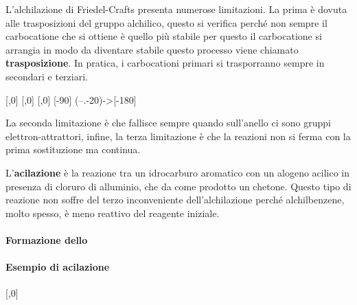 L'alchilazione di Friedel-Crafts presenta numerose limitazioni. La prima è dovuta alle trasposizioni del gruppo alchilico, questo si verifica perché non sempre il carbocatione che si ottiene è quello più stabile per questo il carbocatione si arrangia in modo da diventare stabile questo processo viene chiamato \textbf{trasposizione}. In pratica, i carbocationi primari si trasporranno sempre in secondari e terziari.
\chemnameinit{}
\begin{reaction}
	[,0]
	 [,0]\+ 
	 [,0]\+ 
	\arrow{->[*{0}trasposizione]}[-90]
	\arrow(--.-20){->}[-180]
\end{reaction}
\chemnameinit{}
La seconda limitazione è che fallisce sempre quando sull'anello ci sono gruppi elettron-attrattori, infine, la terza limitazione è che la reazioni non si ferma con la prima sostituzione ma continua.


L'\textbf{acilazione} è la reazione tra un idrocarburo aromatico con un alogeno acilico in presenza di cloruro di alluminio, che da come prodotto un chetone. Questo tipo di reazione non soffre del terzo inconveniente dell'alchilazione perché alchilbenzene, molto spesso, è meno reattivo del reagente iniziale.

\paragraph{Formazione dello }
\begin{reaction}
	 \+ 
	\arrow{<=>}
	\arrow[-90]
	\hspace{.5em}
\end{reaction}

\paragraph{Esempio di acilazione}
\begin{reaction}
	[,0]
	 \+{,,1.7em} 
	\arrow
\end{reaction}